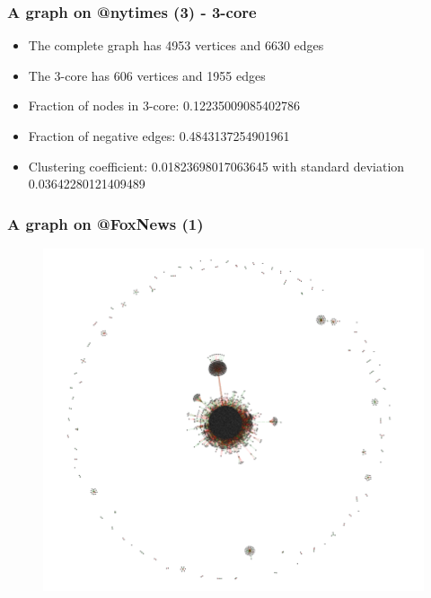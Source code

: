 \documentclass{beamer}
\begin{document}
\begin{frame}[c]
    \frametitle{A graph on @nytimes (3) - 3-core}
    \begin{itemize}
        \item The complete graph has 4953 vertices and 6630 edges
        \item The 3-core has 606 vertices and 1955 edges
        \item Fraction of nodes in 3-core: 0.12235009085402786
        \item Fraction of negative edges: 0.4843137254901961
        \item Clustering coefficient: 0.01823698017063645 with standard deviation 0.03642280121409489
    \end{itemize}
\end{frame}

\begin{frame}[c]
    \frametitle{A graph on @FoxNews (1)}
    \begin{figure}[htpb]
        \centering
        \includegraphics[width=0.8\linewidth]{img/foxnews_20.png}
        \label{fig:img/foxnews_20}
    \end{figure}

    
\end{frame}

\end{document}
